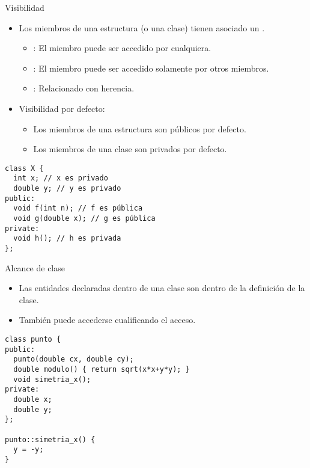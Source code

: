 \begin{frame}[t,fragile]{Visibilidad}
\begin{itemize}
  \item Los miembros de una estructura (o una clase) tienen asociado 
        un .
    \begin{itemize}
      \item {}: El miembro puede ser accedido por cualquiera.
      \item {}: El miembro puede ser accedido solamente por otros miembros.
      \item {}: Relacionado con herencia.
    \end{itemize}
  \item Visibilidad por defecto:
    \begin{itemize}
      \item Los miembros de una estructura son públicos por defecto.
      \item Los miembros de una clase son privados por defecto.
    \end{itemize}
\end{itemize}
\vspace{-0.25cm}
\begin{lstlisting}
class X {
  int x; // x es privado
  double y; // y es privado
public:
  void f(int n); // f es pública
  void g(double x); // g es pública
private:
  void h(); // h es privada
};
\end{lstlisting}
\end{frame}

\begin{frame}[t,fragile]{Alcance de clase}
\begin{itemize}
  \item Las entidades declaradas dentro de una clase son 
         dentro de la definición de la clase.
  \item También puede accederse cualificando el acceso.
\end{itemize}
\begin{lstlisting}
class punto {
public:
  punto(double cx, double cy);
  double modulo() { return sqrt(x*x+y*y); }
  void simetria_x();
private:
  double x;
  double y;
};

punto::simetria_x() {
  y = -y;
}

\end{lstlisting}
\end{frame}

